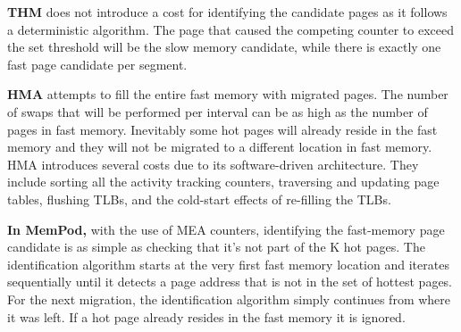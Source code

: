 	\textbf{THM} does not introduce a cost for identifying the candidate pages as it follows a deterministic algorithm. The page that caused the competing counter to exceed the set threshold will be the slow memory candidate, while there is exactly one fast page candidate per segment.

    \textbf{HMA} attempts to fill the entire fast memory with migrated pages. The number of swaps that will be performed per interval can be as high as the number of pages in fast memory. Inevitably some hot pages will already reside in the fast memory and they will not be migrated to a different location in fast memory. 
HMA introduces several costs due to its software-driven architecture.
They include sorting all the activity tracking counters, traversing and updating page tables, flushing TLBs, and the cold-start effects of re-filling
the TLBs.

	\textbf{In MemPod,} with the use of MEA counters, identifying the fast-memory page candidate is as simple as checking that it's not part of the K hot pages. The identification algorithm starts at the very first fast memory location and iterates sequentially until it detects a page address that is not in the set of hottest pages. For the next migration, the identification algorithm simply continues from where it was left. If a hot page already resides in the fast memory it is ignored.



